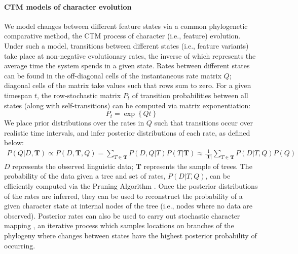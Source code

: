 \documentclass[11pt]{article}
\begin{document}
\paragraph{CTM models of character evolution}
We model changes between different feature states via a common phylogenetic comparative method, the 
CTM 
process of character (i.e., feature) evolution.
Under such a model, transitions between different states (i.e., feature variants) take place at non-negative evolutionary {\sc rates}, the inverse of which represents the average time the system spends in a given state.
Rates between different states can be found in the off-diagonal cells of the instantaneous rate matrix $Q$; diagonal cells of the matrix take values such that rows sum to zero.
For a given timespan $t$, the row-stochastic matrix $P_t$ of transition {\sc probabilities} between all states (along with self-transitions) can be computed via matrix exponentiation:
$$
P_t = \exp\left\{{Qt}\right\}
$$
We place prior distributions over the rates in $Q$ such that transitions occur over realistic time intervals, and infer posterior distributions of each rate, as defined below:
\begin{equation}
\begin{aligned}
P(Q|D,\boldsymbol T) \propto P(D,\boldsymbol T,Q) = \sum_{T \in \boldsymbol T} P(D,Q|T) P(T|\boldsymbol T) \approx \frac{1}{|\boldsymbol T|} \sum_{T \in \boldsymbol T} P(D|T,Q) P(Q)
\end{aligned}
\label{posterior}
\end{equation}
$D$ represents the observed linguistic data; $\boldsymbol T$ represents the sample of trees. The probability of the data given a tree and set of rates, $P(D|T,Q)$, 
can be efficiently computed via the Pruning Algorithm \citep[251--5]{Felsenstein2004}. 
Once the posterior distributions of the rates are inferred, they can be used to reconstruct the probability of a given character state at internal nodes of the tree (i.e., nodes where no data are observed). %
Posterior rates can also be used to carry out stochastic character mapping \citep[SCM;][]{Nielsen2002,Huelsenbecketal2003,Bollback2006}, an iterative process which samples locations on branches of the phylogeny where changes between states have the highest posterior probability of occurring. 
\end{document}
